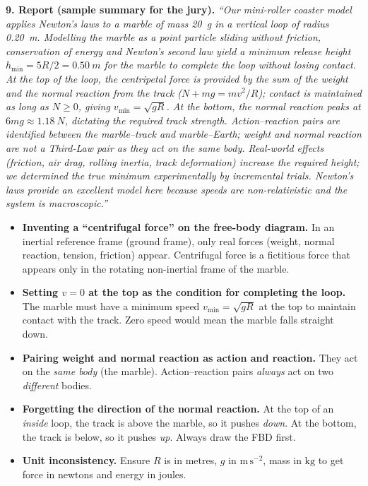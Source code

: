 \documentclass[11pt]{article}
\begin{document}
\textbf{9. Report (sample summary for the jury).}
\emph{``Our mini-roller coaster model applies Newton's laws to a marble of mass \SI{20}{g} in a vertical loop of radius \SI{0.20}{m}. Modelling the marble as a point particle sliding without friction, conservation of energy and Newton's second law yield a minimum release height $h_{\min} = 5R/2 = \SI{0.50}{m}$ for the marble to complete the loop without losing contact. At the top of the loop, the centripetal force is provided by the sum of the weight and the normal reaction from the track ($N + mg = mv^2/R$); contact is maintained as long as $N \ge 0$, giving $v_{\min} = \sqrt{gR}$. At the bottom, the normal reaction peaks at $6mg \approx \SI{1.18}{N}$, dictating the required track strength. Action--reaction pairs are identified between the marble--track and marble--Earth; weight and normal reaction are not a Third-Law pair as they act on the same body. Real-world effects (friction, air drag, rolling inertia, track deformation) increase the required height; we determined the true minimum experimentally by incremental trials. Newton's laws provide an excellent model here because speeds are non-relativistic and the system is macroscopic.''}

\begin{attention}
\begin{itemize}
\item \textbf{Inventing a ``centrifugal force'' on the free-body diagram.} In an inertial reference frame (ground frame), only real forces (weight, normal reaction, tension, friction) appear. Centrifugal force is a fictitious force that appears only in the rotating non-inertial frame of the marble.
\item \textbf{Setting $v=0$ at the top as the condition for completing the loop.} The marble must have a minimum speed $v_{\min} = \sqrt{gR}$ at the top to maintain contact with the track. Zero speed would mean the marble falls straight down.
\item \textbf{Pairing weight and normal reaction as action and reaction.} They act on the \emph{same body} (the marble). Action--reaction pairs \emph{always} act on two \emph{different} bodies.
\item \textbf{Forgetting the direction of the normal reaction.} At the top of an \emph{inside} loop, the track is above the marble, so it pushes \emph{down}. At the bottom, the track is below, so it pushes \emph{up}. Always draw the FBD first.
\item \textbf{Unit inconsistency.} Ensure $R$ is in metres, $g$ in $\mathrm{m\,s^{-2}}$, mass in $\mathrm{kg}$ to get force in newtons and energy in joules.
\end{itemize}
\end{attention}
\end{document}
